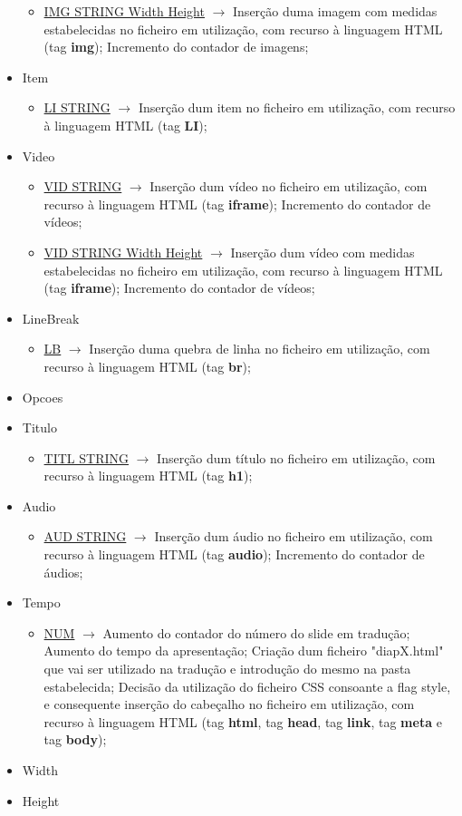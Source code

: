 \documentclass[11pt,a4paper]{report}
\begin{document}
\begin{itemize}
\begin{itemize}
		\item \underline{IMG STRING Width Height}  $\rightarrow$ Inserção duma imagem com medidas estabelecidas no ficheiro em utilização, com recurso à linguagem HTML (tag \textbf{img}); Incremento do contador de imagens;
	\end{itemize}
	\item Item
	\begin{itemize}
		\item \underline{LI STRING}  $\rightarrow$ Inserção dum item no ficheiro em utilização, com recurso à linguagem HTML (tag \textbf{LI});
	\end{itemize}
	\item Video
	\begin{itemize}
		\item \underline{VID STRING}  $\rightarrow$ Inserção dum vídeo no ficheiro em utilização, com recurso à linguagem HTML (tag \textbf{iframe}); Incremento do contador de vídeos;
		\item \underline{VID STRING Width Height}  $\rightarrow$ Inserção dum vídeo com medidas estabelecidas no ficheiro em utilização, com recurso à linguagem HTML (tag \textbf{iframe}); Incremento do contador de vídeos;
	\end{itemize}
	\item LineBreak
	\begin{itemize}
		\item \underline{LB}  $\rightarrow$ Inserção duma quebra de linha no ficheiro em utilização, com recurso à linguagem HTML (tag \textbf{br});
	\end{itemize}
	\item Opcoes
	\item Titulo
	\begin{itemize}
		\item \underline{TITL STRING}  $\rightarrow$ Inserção dum título no ficheiro em utilização, com recurso à linguagem HTML (tag \textbf{h1});
	\end{itemize}
	\item Audio
	\begin{itemize}
		\item \underline{AUD STRING}  $\rightarrow$ Inserção dum áudio no ficheiro em utilização, com recurso à linguagem HTML (tag \textbf{audio}); Incremento do contador de áudios;
	\end{itemize}
	\item Tempo
	\begin{itemize}
		\item \underline{NUM}  $\rightarrow$ Aumento do contador do número do slide em tradução; Aumento do tempo da apresentação; Criação dum ficheiro "diapX.html" que vai ser utilizado na tradução e introdução do mesmo na pasta estabelecida; Decisão da utilização do ficheiro CSS consoante a flag style, e consequente inserção do cabeçalho no ficheiro em utilização, com recurso à linguagem HTML (tag \textbf{html}, tag \textbf{head}, tag \textbf{link}, tag \textbf{meta} e tag \textbf{body});
	\end{itemize}
	\item Width
	\item Height
\end{itemize}
\end{document}
